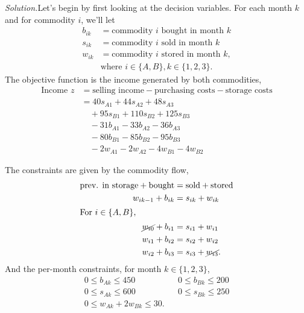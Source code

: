 \documentclass{homework}
\begin{document}
\begin{enumerate}
\begin{enumerate}
			\vspace{1em}
			
			\textit{Solution.}\quad Let's begin by first looking at the decision variables. For each month $k$ and for commodity $i$, we'll let \begin{align*}
				b_{ik} & = \text{commodity $i$ bought in month $k$} \\
				s_{ik} & = \text{commodity $i$ sold in month $k$} \\
				w_{ik} & = \text{commodity $i$ stored in month $k$}, \\
				& \text{where } i \in \{ A, B\}, k \in \{1, 2, 3\}.
			\end{align*}
			The objective function is the income generated by both commodities, \begin{align*}
				\text{Income } z & = \text{selling income} - \text{purchasing costs} - \text{storage costs} \\
					& = 40 s_{A1} + 44 s_{A2} + 48 s_{A3} \\
					& \quad + 95 s_{B1} + 110 s_{B2} + 125 s_{B3} \\
					& \quad - 31 b_{A1} - 33 b_{A2} - 36 b_{A3} \\
					& \quad - 80 b_{B1} - 85 b_{B2} - 95 b_{B3} \\
					& \quad - 2 w_{A1} - 2 w_{A2} - 4 w_{B1} - 4 w_{B2}
			\end{align*}
		
			The constraints are given by the commodity flow,
			\begin{align*}
				\text{prev. in storage} + \text{bought} & = \text{sold} + \text{stored} \\
				w_{ik-1} + b_{ik} & = s_{ik} + w_{ik} \\
				\intertext{For $i \in \{A, B\}$,}
				\cancel{w_{i0}} + b_{i1} & = s_{i1} + w_{i1} \\
				w_{i1} + b_{i2} & = s_{i2} + w_{i2} \\
				w_{i2} + b_{i3} & = s_{i3} + \cancel{w_{i3}}.
			\end{align*}
			And the per-month constraints, for month $k \in \{1, 2, 3\}$, \begin{align*}
				0 \le b_{Ak} \le 450 && 0 \le b_{Bk} \le 200 \\
				0 \le s_{Ak} \le 600 && 0 \le s_{Bk} \le 250 \\
				0 \le w_{Ak} + 2 w_{Bk} \le 30. && 
			\end{align*}
		

\end{enumerate}
\end{enumerate}
\end{document}

